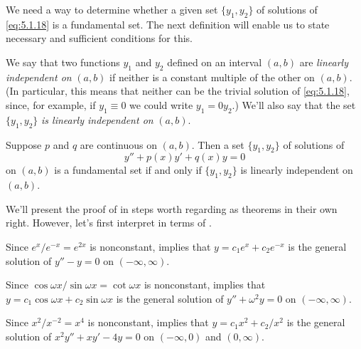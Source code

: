 
We need a way to determine whether a given set $\{y_1,y_2\}$
of solutions of \eqref{eq:5.1.18}  is a fundamental set.
The next definition will enable us to state necessary and
sufficient conditions for this.

We say that two functions $y_1$ and $y_2$ defined on an interval
$(a,b)$ are \emph{\color{blue}linearly independent on} $(a,b)$ if neither is a
constant multiple of the other on $(a,b)$. (In
particular, this means
that neither can be the trivial solution of \eqref{eq:5.1.18}, since, for
example, if $y_1\equiv0$  we could write $y_1=0y_2$.) We'll also
say that the set $\{y_1,y_2\}$ \emph{\color{blue}is linearly independent on}
$(a,b)$.

 \begin{theorem}\label{thmtype:5.1.3}
Suppose $p$ and $q$ are continuous on $(a,b)$. Then a set
$\{y_1,y_2\}$ of solutions of
\begin{equation}\label{eq:5.1.20}
y''+p(x)y'+q(x)y=0
\end{equation}
on $(a,b)$ is a fundamental set if and only if $\{y_1,y_2\}$ is
linearly independent on $(a,b)$.
\end{theorem}

We'll present the proof of  in steps worth
regarding as theorems in their own right. However, let's first
interpret  in terms of
.

\begin{example}\label{example:5.1.4}
\begin{alist}
\item %
Since $e^x/e^{-x}=e^{2x}$ is nonconstant, 
implies that $y=c_1e^x+c_2e^{-x}$ is the general solution of $y''-y=0$
on $(-\infty,\infty)$.
\item %
Since $\cos\omega x/\sin\omega x=\cot\omega x$ is nonconstant,
 implies that
 $y=c_1\cos\omega x+c_2\sin\omega x$ is the general solution
of $y''+\omega^2y=0$ on $(-\infty,\infty)$.
\item %
Since $x^2/x^{-2}=x^4$ is nonconstant,
 implies that
 $y=c_1x^2+c_2/x^2$ is the general
solution of $x^2y''+xy'-4y=0$ on $(-\infty,0)$ and $(0,\infty)$.
\end{alist}
\end{example}


